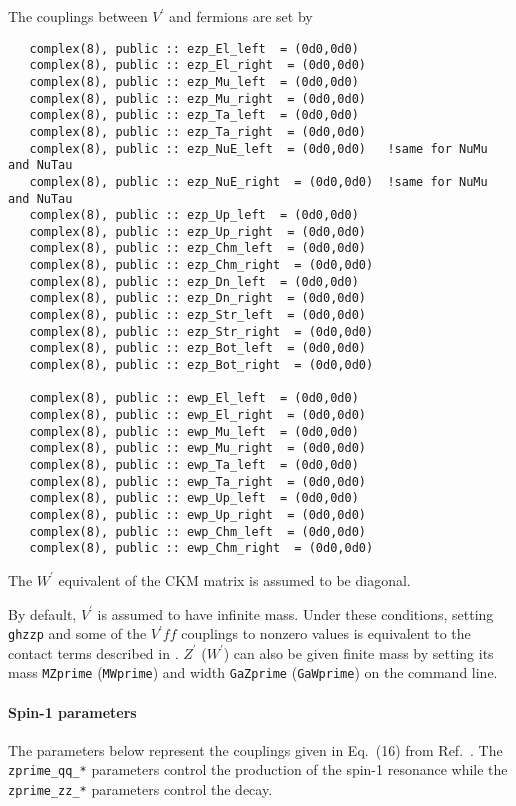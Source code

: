 \documentclass[aps,superscriptaddress,nofootinbib]{revtex4}
\begin{document}
The couplings between $V^\prime$ and fermions are set by
\begin{verbatim}
   complex(8), public :: ezp_El_left  = (0d0,0d0)
   complex(8), public :: ezp_El_right  = (0d0,0d0)
   complex(8), public :: ezp_Mu_left  = (0d0,0d0)
   complex(8), public :: ezp_Mu_right  = (0d0,0d0)
   complex(8), public :: ezp_Ta_left  = (0d0,0d0)
   complex(8), public :: ezp_Ta_right  = (0d0,0d0)
   complex(8), public :: ezp_NuE_left  = (0d0,0d0)   !same for NuMu and NuTau
   complex(8), public :: ezp_NuE_right  = (0d0,0d0)  !same for NuMu and NuTau
   complex(8), public :: ezp_Up_left  = (0d0,0d0)
   complex(8), public :: ezp_Up_right  = (0d0,0d0)
   complex(8), public :: ezp_Chm_left  = (0d0,0d0)
   complex(8), public :: ezp_Chm_right  = (0d0,0d0)
   complex(8), public :: ezp_Dn_left  = (0d0,0d0)
   complex(8), public :: ezp_Dn_right  = (0d0,0d0)
   complex(8), public :: ezp_Str_left  = (0d0,0d0)
   complex(8), public :: ezp_Str_right  = (0d0,0d0)
   complex(8), public :: ezp_Bot_left  = (0d0,0d0)
   complex(8), public :: ezp_Bot_right  = (0d0,0d0)

   complex(8), public :: ewp_El_left  = (0d0,0d0)
   complex(8), public :: ewp_El_right  = (0d0,0d0)
   complex(8), public :: ewp_Mu_left  = (0d0,0d0)
   complex(8), public :: ewp_Mu_right  = (0d0,0d0)
   complex(8), public :: ewp_Ta_left  = (0d0,0d0)
   complex(8), public :: ewp_Ta_right  = (0d0,0d0)
   complex(8), public :: ewp_Up_left  = (0d0,0d0)
   complex(8), public :: ewp_Up_right  = (0d0,0d0)
   complex(8), public :: ewp_Chm_left  = (0d0,0d0)
   complex(8), public :: ewp_Chm_right  = (0d0,0d0)
\end{verbatim}
The $W^\prime$ equivalent of the CKM matrix is assumed to be diagonal.

By default, $V^\prime$ is assumed to have infinite mass.  Under these conditions, setting \verb|ghzzp| and  some of the $V^\prime ff$ couplings to nonzero values is equivalent to the contact terms described in \cite{Gonzalez-Alonso:2014eva}.  $Z^\prime$ ($W^\prime$) can also be given finite mass by setting its mass \verb|MZprime| (\verb|MWprime|) and width \verb|GaZprime| (\verb|GaWprime|) on the command line.



\paragraph{Spin-1 parameters}
\label{spin1}

The parameters below represent the couplings given in Eq.~(16) from Ref.~\cite{Bolognesi:2012}. The \verb|zprime_qq_*| parameters control the production of the spin-1 resonance while the \verb|zprime_zz_*| parameters control the decay.
\end{document}
